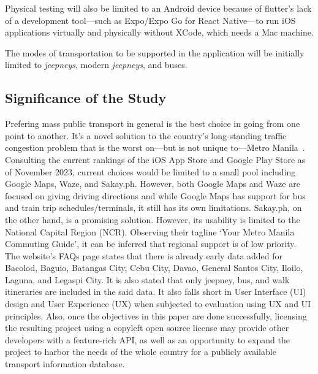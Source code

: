 \documentclass{icsthesis}
\begin{document}
\begin{mainmatter}
Physical testing will also be limited to an Android device because of flutter's lack of a development tool---such as Expo/Expo Go for React Native---to run iOS applications virtually and physically without XCode, which needs a Mac machine.

The modes of transportation to be supported in the application will be initially limited to \textit{jeepneys}, modern \textit{jeepneys}, and buses.  

\subsection{Significance of the Study}
Prefering mass public transport in general is the best choice in going from one point to another. %
It's a novel solution to the country's long-standing traffic congestion problem that is the worst on---but is not unique to---Metro Manila~\cite{RamizoJr19}.
Consulting the current rankings of the iOS App Store and Google Play Store as of November 2023, current choices would be limited to a small pool including Google Maps, Waze, and Sakay.ph. However, both Google Maps and Waze are focused on giving driving directions and while Google Maps has support for bus and train trip schedules/terminals, it still has its own limitations.
Sakay.ph, on the other hand, is a promising solution. However, its usability is limited to the National Capital Region (NCR). Observing their tagline `Your Metro Manila Commuting Guide', it can be inferred that regional support is of low priority. The website's FAQs page states that there is already early data added for Bacolod, Baguio, Batangas City, Cebu City, Davao, General Santos City, Iloilo, Laguna, and Legaspi City.
It is also stated that only jeepney, bus, and walk itineraries are included in the said data. %
It also falls short in User Interface (UI) design and User Experience (UX) when subjected to evaluation using UX and UI principles. %
Also, once the objectives in this paper are done successfully, licensing the resulting project using a copyleft open source license may provide other developers with a feature-rich API, as well as an opportunity to expand the
project to harbor the needs of the whole country for a publicly available transport information database. 



\end{mainmatter}
\end{document}
